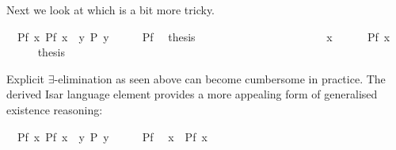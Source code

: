 \begin{isabellebody}
\begin{isamarkuptext}
Next we look at \isa{{\isasymexists}} which is a bit more tricky.%
\end{isamarkuptext}%
\isamarkupfalse%
\ \ Pf{\isacharcolon}\ {\isachardoublequote}{\isasymexists}x{\isachardot}\ P{\isacharparenleft}f\ x{\isacharparenright}{\isachardoublequote}\ \ {\isachardoublequote}{\isasymexists}y{\isachardot}\ P\ y{\isachardoublequote}\isanewline
%
\isadelimproof
%
\endisadelimproof
%
\isatagproof
\isamarkupfalse%
\ {\isacharminus}\isanewline
\ \ \isamarkupfalse%
\ Pf\ \isamarkupfalse%
\ {\isacharquery}thesis\isanewline
\ \ \isamarkupfalse%
\ \ \ \ \ \ \ \ \ \ \ \ \ \ %
\isanewline
\ \ \ \ \isamarkupfalse%
\ x\isanewline
\ \ \ \ \isamarkupfalse%
\ {\isachardoublequote}P{\isacharparenleft}f\ x{\isacharparenright}{\isachardoublequote}\isanewline
\ \ \ \ \isamarkupfalse%
\ {\isacharquery}thesis\ \isamarkupfalse%
\isacommand{{\isachardot}{\isachardot}}\ \ %
\isanewline
\ \ \isamarkupfalse%
\isanewline
\isamarkupfalse%
%
\endisatagproof
{\isafoldproof}%
%
\isadelimproof
%
\endisadelimproof
\isamarkuptrue%
%
\begin{isamarkuptext}%
\noindent Explicit $\exists$-elimination as seen above can become
cumbersome in practice.  The derived Isar language element
 provides a more appealing form of generalised
existence reasoning:%
\end{isamarkuptext}%
\isamarkupfalse%
\ \ Pf{\isacharcolon}\ {\isachardoublequote}{\isasymexists}x{\isachardot}\ P{\isacharparenleft}f\ x{\isacharparenright}{\isachardoublequote}\ \ {\isachardoublequote}{\isasymexists}y{\isachardot}\ P\ y{\isachardoublequote}\isanewline
%
\isadelimproof
%
\endisadelimproof
%
\isatagproof
\isamarkupfalse%
\ {\isacharminus}\isanewline
\ \ \isamarkupfalse%
\ Pf\ \isamarkupfalse%
\ x\ \ {\isachardoublequote}P{\isacharparenleft}f\ x{\isacharparenright}{\isachardoublequote}\ \isamarkupfalse%

\end{isabellebody}
